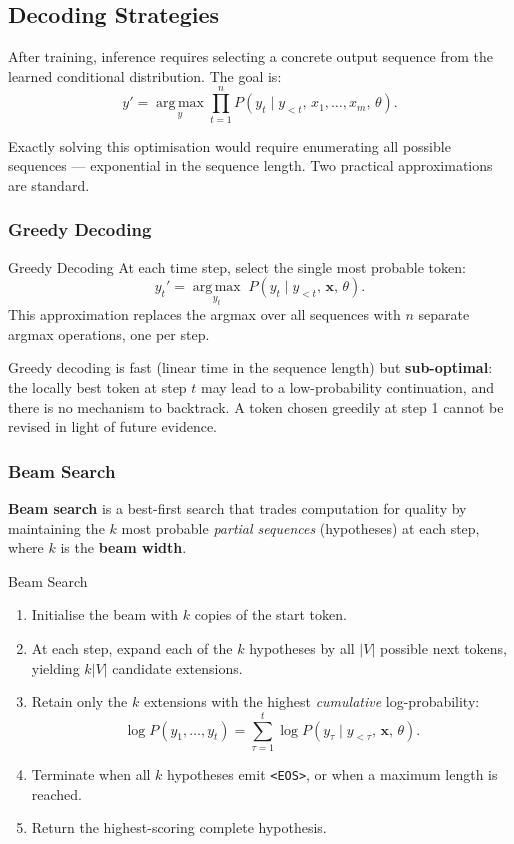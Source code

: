 \documentclass[11pt,a4paper]{article}
\newcommand{\term}[1]{\textcolor{DefGreen}{\textbf{#1}}}
\begin{document}
\subsection{Decoding Strategies}
\label{sec:decoding}

After training, inference requires selecting a concrete output sequence from the learned conditional distribution. The goal is:
\[
  y' = \operatorname*{arg\,max}_{y} \prod_{t=1}^{n} P(y_t \mid y_{<t},\, x_1, \ldots, x_m,\, \theta).
\]

Exactly solving this optimisation would require enumerating all possible sequences — exponential in the sequence length. Two practical approximations are standard.

\subsubsection{Greedy Decoding}

\begin{defbox}{Greedy Decoding}
At each time step, select the single most probable token:
\[
  y_t' = \operatorname*{arg\,max}_{y_t}\; P(y_t \mid y_{<t},\, \mathbf{x},\, \theta).
\]
This approximation replaces the argmax over all sequences with $n$ separate argmax operations, one per step.
\end{defbox}

Greedy decoding is fast (linear time in the sequence length) but \textbf{sub-optimal}: the locally best token at step $t$ may lead to a low-probability continuation, and there is no mechanism to backtrack. A token chosen greedily at step 1 cannot be revised in light of future evidence.

\subsubsection{Beam Search}

\term{Beam search} is a best-first search that trades computation for quality by maintaining the $k$ most probable \emph{partial sequences} (hypotheses) at each step, where $k$ is the \term{beam width}.

\begin{algobox}{Beam Search}
\begin{enumerate}
  \item Initialise the beam with $k$ copies of the start token.
  \item At each step, expand each of the $k$ hypotheses by all $|V|$ possible next tokens, yielding $k|V|$ candidate extensions.
  \item Retain only the $k$ extensions with the highest \emph{cumulative} log-probability:
  \[
    \log P(y_1, \ldots, y_t) = \sum_{\tau=1}^{t} \log P(y_\tau \mid y_{<\tau},\, \mathbf{x},\, \theta).
  \]
  \item Terminate when all $k$ hypotheses emit \texttt{<EOS>}, or when a maximum length is reached.
  \item Return the highest-scoring complete hypothesis.
\end{enumerate}
\end{algobox}
\end{document}
